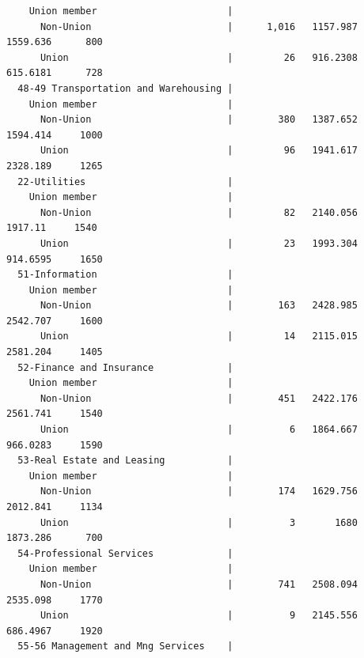 \documentclass[
]{book}
\begin{document}
\begin{verbatim}
    Union member                       |                                                    
      Non-Union                        |      1,016   1157.987             1559.636      800
      Union                            |         26   916.2308             615.6181      728
  48-49 Transportation and Warehousing |                                                    
    Union member                       |                                                    
      Non-Union                        |        380   1387.652             1594.414     1000
      Union                            |         96   1941.617             2328.189     1265
  22-Utilities                         |                                                    
    Union member                       |                                                    
      Non-Union                        |         82   2140.056              1917.11     1540
      Union                            |         23   1993.304             914.6595     1650
  51-Information                       |                                                    
    Union member                       |                                                    
      Non-Union                        |        163   2428.985             2542.707     1600
      Union                            |         14   2115.015             2581.204     1405
  52-Finance and Insurance             |                                                    
    Union member                       |                                                    
      Non-Union                        |        451   2422.176             2561.741     1540
      Union                            |          6   1864.667             966.0283     1590
  53-Real Estate and Leasing           |                                                    
    Union member                       |                                                    
      Non-Union                        |        174   1629.756             2012.841     1134
      Union                            |          3       1680             1873.286      700
  54-Professional Services             |                                                    
    Union member                       |                                                    
      Non-Union                        |        741   2508.094             2535.098     1770
      Union                            |          9   2145.556             686.4967     1920
  55-56 Management and Mng Services    |                                                    

\end{verbatim}
\end{document}
